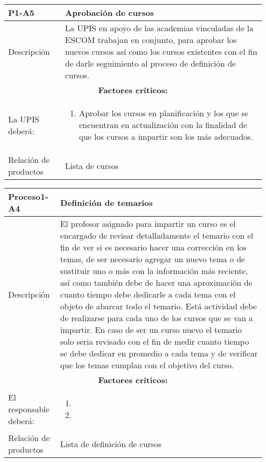 \begin{table}[H]
	\centering
	\begin{tabular}{p{3.5cm} p{12.5cm}}
		\hline
		\rowcolor{LightBlue2} \textbf{P1-A5} & \textbf{Aprobación de cursos}\\
		\hline\hline
		Descripción & La UPIS en apoyo de las academias vinculadas de la ESCOM trabajan en conjunto, para aprobar los nuevos cursos así como los cursos existentes con el fin de darle seguimiento al proceso de definición de cursos.\\
		\hline	\hline		
			\multicolumn{2}{|c|}{\textbf{Factores críticos:}}\\
		\hline\hline
			{La UPIS deberá:}&
			\begin{enumerate}
				\item Aprobar los cursos en planificación y los que se encuentran en actualización con la finalidad de que los cursos a impartir son los más adecuados.
			\end{enumerate}\\
		\hline
		Relación de productos & Lista de cursos\\
		\hline
	\end{tabular}
\end{table}

\begin{table}[H]
	\centering
	\begin{tabular}{p{3.5cm} p{12.5cm}}
		\hline
		\rowcolor{LightBlue2} \textbf{Proceso1-A4} & \textbf{Definición de temarios}\\
		\hline\hline
		Descripción & El profesor asignado para impartir un curso es el encargado de revisar detalladamente el temario con el fin de ver si es necesario hacer una corrección en los temas, de ser necesario agregar un nuevo tema o de sustituir uno o más con la información más reciente, así como también debe de hacer una aproximación de cuanto tiempo debe dedicarle a cada tema con el objeto de abarcar todo el temario. Está actividad debe de realizarse para cada uno de los cursos que se van a impartir. En caso de ser un curso nuevo el temario solo seria revisado con el fin de medir cuanto tiempo se debe dedicar en promedio a cada tema y de verificar que los temas cumplan con el objetivo del curso.\\	
		\hline	\hline		
			\multicolumn{2}{|c|}{\textbf{Factores críticos:}}\\
		\hline\hline
			{El responsable deberá:}&
			\begin{enumerate}
				\item 
				\item 
			\end{enumerate}\\		
		\hline
		Relación de productos & Lista de definici\'on de cursos\\
		\hline
	\end{tabular}
\end{table}